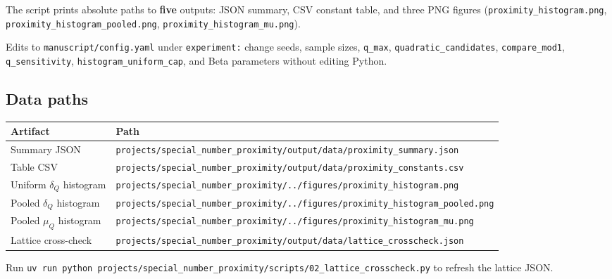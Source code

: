\documentclass[
]{article}
\newcounter{none} %
\begin{document}
The script prints absolute paths to \textbf{five} outputs: JSON summary,
CSV constant table, and three PNG figures
(\texttt{proximity\_histogram.png},
\texttt{proximity\_histogram\_pooled.png},
\texttt{proximity\_histogram\_mu.png}).

Edits to \texttt{manuscript/config.yaml} under \texttt{experiment:}
change seeds, sample sizes, \texttt{q\_max},
\texttt{quadratic\_candidates}, \texttt{compare\_mod1},
\texttt{q\_sensitivity}, \texttt{histogram\_uniform\_cap}, and Beta
parameters without editing Python.

\subsection{Data paths}\label{data-paths}

{\def\LTcaptype{none} %
\begin{longtable}[]{@{}
  >{\raggedright\arraybackslash}p{}
  >{\raggedright\arraybackslash}p{}@{}}
\toprule\noalign{}
\begin{minipage}[b]{\linewidth}\raggedright
Artifact
\end{minipage} & \begin{minipage}[b]{\linewidth}\raggedright
Path
\end{minipage} \\
\midrule\noalign{}
\endhead
\bottomrule\noalign{}
\endlastfoot
Summary JSON &
\texttt{projects/special\_number\_proximity/output/data/proximity\_summary.json} \\
Table CSV &
\texttt{projects/special\_number\_proximity/output/data/proximity\_constants.csv} \\
Uniform \(\delta_Q\) histogram &
\texttt{projects/special\_number\_proximity/../figures/proximity\_histogram.png} \\
Pooled \(\delta_Q\) histogram &
\texttt{projects/special\_number\_proximity/../figures/proximity\_histogram\_pooled.png} \\
Pooled \(\mu_Q\) histogram &
\texttt{projects/special\_number\_proximity/../figures/proximity\_histogram\_mu.png} \\
Lattice cross-check &
\texttt{projects/special\_number\_proximity/output/data/lattice\_crosscheck.json} \\
\end{longtable}
}

Run
\texttt{uv\ run\ python\ projects/special\_number\_proximity/scripts/02\_lattice\_crosscheck.py}
to refresh the lattice JSON.
\end{document}
